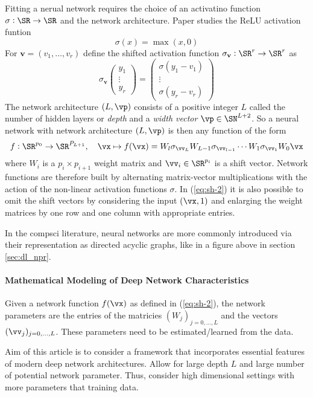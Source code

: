 Fitting a nerual network requires the choice of an activatino function $\sigma: \SR\to\SR$ and the network architecture. Paper studies the ReLU activation funtion 
\[\sigma(x) = \max(x,0)\]
For $\mathbf{v} = (v_1, \dots, v_r)$ define the shifted activation function $\sigma_{\mathbf{v}}: \SR^r\to\SR^r$ as 
\[\sigma_{\mathbf{v}}\begin{pmatrix}y_1 \\ \vdots \\y_r\end{pmatrix} = \begin{pmatrix} \sigma(y_1 - v_1 )\\    \vdots \\ \sigma(y_r - v_r) \end{pmatrix}\]
The network architecture $(L, \vp)$ consists of a positive integer $L$ called the number of hidden layers or \emph{depth} and a \emph{width vector} $\vp \in \SN^{L+2}$. So a neural network with network architecture $(L, \vp)$ is then any function of the form 
\begin{equation}
	\label{eq:sh-2}
	f:\SR^{p_0}\to\SR^{P_{L+1}}, \hbox{ }\hbox{ }\hbox{ }\vx\mapsto f(\vx) = W_l \sigma_{\vv_L} W_{L-1}\sigma_{\vv_{l-1}}\cdots W_1\sigma_{\vv_1}W_0\vx
\end{equation}
where $W_i$ is a $p_i \times p_{i+1}$ weight matrix and $\vv_i \in \SR^{p_i}$ is a shift vector. Network functions are therefore built by alternating matrix-vector multiplications with the action of the non-linear activation functions $\sigma$. In (\ref{eq:sh-2}) it is also possible to omit the shift vectors by considering the input $(\vx, 1)$ and enlarging the weight matrices by one row and one column with appropriate entries. 

In the compsci literature, neural networks are more commonly introduced via their representation as directed acyclic graphs, like in a figure above in section \ref{sec:dl_npr}.

\paragraph{Mathematical Modeling of Deep Network Characteristics} 

Given a network function \(f(\vx)\) as defined in (\ref{eq:sh-2}), the network parameters are the entries of the matricies $(W_j)_{j = 0,\dots, L}$ and the vectors $(\vv_j)_{j = 0,\dots, L}$. These parameters need to be estimated/learned from the data. 

Aim of this article is to consider a framework that incorporates essential features of modern deep network architectures. Allow for large depth $L$ and large number of potential network parameter. Thus, consider high dimensional settings with more parameters that training data. 

